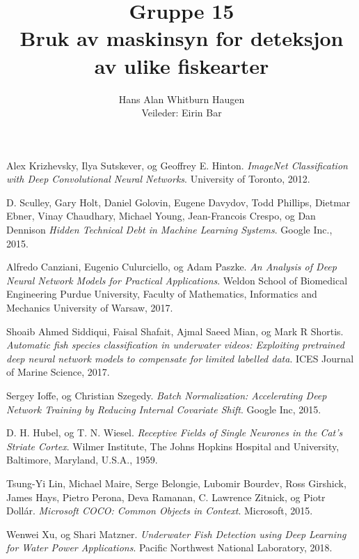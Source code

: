 \documentclass[11ot]{article}
\title{Gruppe 15\\Bruk av maskinsyn for deteksjon av ulike fiskearter}
\author{Hans Alan Whitburn Haugen\\Veileder: Eirin Bar}
\begin{document}

\newpage

\newpage

\newpage

\tableofcontents
\clearpage
{}
\setcounter{page}{1}








\begin{thebibliography}{9}


Alex Krizhevsky, Ilya Sutskever, og Geoffrey E. Hinton. 
\textit{ImageNet Classification with Deep Convolutional Neural Networks}. 
University of Toronto, 2012.

D. Sculley, Gary Holt, Daniel Golovin, Eugene Davydov, Todd Phillips, Dietmar Ebner, Vinay Chaudhary, Michael Young, Jean-Francois Crespo, og Dan Dennison 
\textit{Hidden Technical Debt in Machine Learning Systems}. 
Google Inc., 2015.

Alfredo Canziani, Eugenio Culurciello, og Adam Paszke. 
\textit{An Analysis of Deep Neural Network Models for Practical Applications}. 
Weldon School of Biomedical Engineering Purdue University, Faculty of Mathematics, Informatics and Mechanics University of Warsaw, 2017.

Shoaib Ahmed Siddiqui, Faisal Shafait, Ajmal Saeed Mian, og Mark R Shortis. 
\textit{Automatic fish species classification in underwater videos: Exploiting pretrained deep neural network models to compensate for limited labelled data}. 
ICES Journal of Marine Science, 2017.

Sergey Ioffe, og Christian Szegedy. 
\textit{Batch Normalization: Accelerating Deep Network Training by Reducing Internal Covariate Shift}. 
Google Inc, 2015.

D. H. Hubel, og T. N. Wiesel. 
\textit{Receptive Fields of Single Neurones in the Cat's Striate Cortex}. 
 Wilmer Institute, The Johns Hopkins Hospital and University, Baltimore, Maryland, U.S.A., 1959.

Tsung-Yi Lin, Michael Maire, Serge Belongie, Lubomir Bourdev, Ross Girshick, James Hays, Pietro Perona, Deva Ramanan, C. Lawrence Zitnick, og Piotr Dollár. 
\textit{Microsoft COCO: Common Objects in Context}. 
Microsoft, 2015.

Wenwei Xu, og Shari Matzner. 
\textit{Underwater Fish Detection using Deep Learning for Water Power Applications}. 
Pacific Northwest National Laboratory, 2018.


\end{thebibliography}
\end{document}
